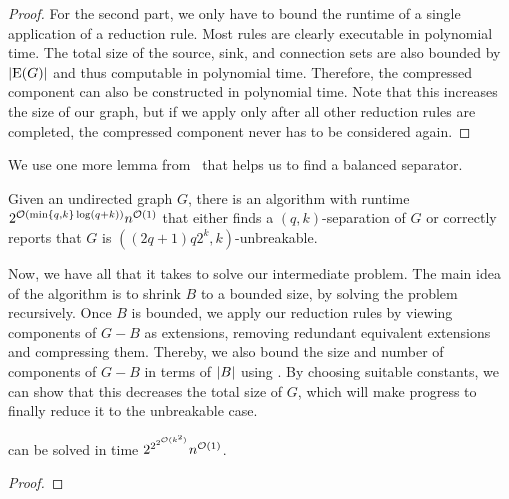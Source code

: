 \begin{theorem}
\begin{lemma}
\begin{theorem}
\begin{lemma}
\begin{reduction*}
\begin{reduction*}
\begin{reduction*}
\begin{reduction*}
\begin{lemma}
\begin{lemma}
\begin{proof}
  For the second part, we only have to bound the runtime of a single application of a reduction rule. Most rules are clearly executable in polynomial time. The total size of the source, sink, and connection sets are also bounded by $\abs{\e{G}}$ and thus computable in polynomial time. Therefore, the compressed component can also be constructed in polynomial time. Note that this increases the size of our graph, but if we apply  only after all other reduction rules are completed, the compressed component never has to be considered again.
\end{proof}
\fi
\fi

\iflong
We use one more lemma from~\cite{golovach2020finding} that helps us to find a balanced separator.

\begin{lemma}\label{lem:separation_algo}
  Given an undirected graph $G$, there is an algorithm with runtime $2^{\mathcal{O}(\min\{q,k\}\log(q+k))}n^{\mathcal{O}(1)}$ that either finds a $(q,k)$-separation of $G$ or correctly reports that $G$ is $((2q+1)q2^k, k)$-unbreakable.
\end{lemma}
\fi

Now, we have all that it takes to solve our intermediate problem.%
%
The main idea of the algorithm is to shrink $B$ to a bounded size, by solving the problem recursively. Once $B$ is bounded, we apply our reduction rules by viewing components of $G-B$ as extensions, removing redundant equivalent extensions and compressing them. Thereby, we also bound the size and number of components of $G-B$ in terms of $\abs{B}$ using . By choosing suitable constants, we can show that this decreases the total size of $G$, which will make progress to finally reduce it to the unbreakable case.

\iflong
\begin{theorem}
\else
\begin{theorem}[$\star$]
\fi
\label{thm:border_scc_fpt}
  \scsborder{} can be solved in time $2^{2^{2^{\mathcal{O}(k^2)}}}n^{\mathcal{O}(1)}$.
\end{theorem}

\iflong
\begin{proof}


\end{proof}
\end{theorem}
\end{lemma}
\end{lemma}
\end{reduction*}
\end{reduction*}
\end{reduction*}
\end{reduction*}
\end{lemma}
\end{theorem}
\end{lemma}
\end{theorem}
